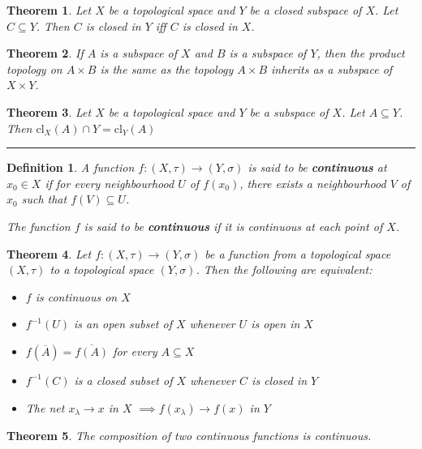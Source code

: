 \documentclass[14pt,twoside]{extreport}
\newcommand{\hhrule}{\vspace{1cm}\hrule\vspace{1cm}}
\theoremstyle{dotless}
\newtheorem*{defn}{Definition}
\newtheorem*{thm}{Theorem} %
\begin{document}
\begin{thm}
    Let $X$ be a topological space and $Y$ be a closed subspace of $X$. Let $C \subseteq Y$. Then $C$ is closed in $Y$ iff $C$ is closed in $X$.
\end{thm}

\begin{thm}
    If $A$ is a subspace of $X$ and $B$ is a subspace of $Y$, then the product topology on $A \times B$ is the same as the topology $A \times B$ inherits as a subspace of $X \times Y$.
\end{thm}

\begin{thm}
    Let $X$ be a topological space and $Y$ be a subspace of $X$. Let $A \subseteq Y$. Then $\text{cl}_X(A) \cap Y = \text{cl}_Y(A)$
\end{thm}

\hhrule

\begin{defn}
    A function $f:(X, \tau) \to (Y, \sigma)$ is said to be \textbf{continuous} at $x_0 \in X$ if for every neighbourhood $U$ of $f(x_0)$, there exists a neighbourhood $V$ of $x_0$ such that $f(V) \subseteq U$.

    The function $f$ is said to be \textbf{continuous} if it is continuous at each point of $X$.
\end{defn}

\begin{thm}
    Let $f:(X,\tau) \to (Y, \sigma)$ be a function from a topological space $(X,\tau)$ to a topological space $(Y,\sigma)$. Then the following are equivalent:
    \begin{itemize}
        \item $f$ is continuous on $X$
        \item $f^{-1}(U)$ is an open subset of $X$ whenever $U$ is open in $X$
        \item $f(\overline{A}) = \overline{f(A)}$ for every $A \subseteq X$
        \item $f^{-1}(C)$ is a closed subset of $X$ whenever $C$ is closed in $Y$
        \item The net $x_\lambda \to x$ in $X$ $\implies f(x_\lambda) \to f(x)$ in $Y$
    \end{itemize}
\end{thm}

\begin{thm}
    The composition of two continuous functions is continuous.
\end{thm}
\end{document}
